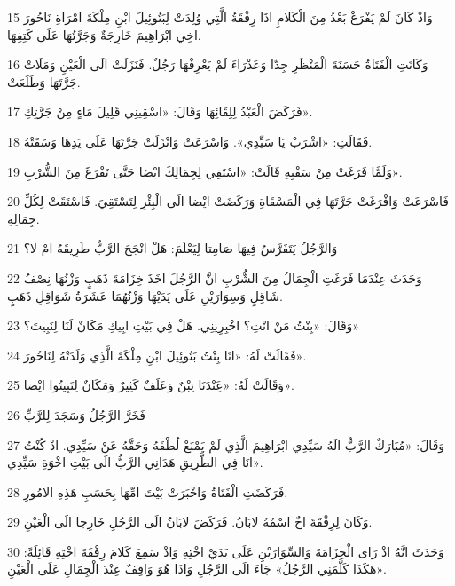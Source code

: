 \par 15 وَاذْ كَانَ لَمْ يَفْرَغْ بَعْدُ مِنَ الْكَلامِ اذَا رِفْقَةُ الَّتِي وُلِدَتْ لِبَتُوئِيلَ ابْنِ مِلْكَةَ امْرَاةِ نَاحُورَ اخِي ابْرَاهِيمَ خَارِجَةٌ وَجَرَّتُهَا عَلَى كَتِفِهَا.
\par 16 وَكَانَتِ الْفَتَاةُ حَسَنَةَ الْمَنْظَرِ جِدّا وَعَذْرَاءَ لَمْ يَعْرِفْهَا رَجُلٌ. فَنَزَلَتْ الَى الْعَيْنِ وَمَلَاتْ جَرَّتَهَا وَطَلَعَتْ.
\par 17 فَرَكَضَ الْعَبْدُ لِلِقَائِهَا وَقَالَ: «اسْقِينِي قَلِيلَ مَاءٍ مِنْ جَرَّتِكِ».
\par 18 فَقَالَتِ: «اشْرَبْ يَا سَيِّدِي». وَاسْرَعَتْ وَانْزَلَتْ جَرَّتَهَا عَلَى يَدِهَا وَسَقَتْهُ.
\par 19 وَلَمَّا فَرَغَتْ مِنْ سَقْيِهِ قَالَتْ: «اسْتَقِي لِجِمَالِكَ ايْضا حَتَّى تَفْرَغَ مِنَ الشُّرْبِ».
\par 20 فَاسْرَعَتْ وَافْرَغَتْ جَرَّتَهَا فِي الْمَسْقَاةِ وَرَكَضَتْ ايْضا الَى الْبِئْرِ لِتَسْتَقِيَ. فَاسْتَقَتْ لِكُلِّ جِمَالِهِ.
\par 21 وَالرَّجُلُ يَتَفَرَّسُ فِيهَا صَامِتا لِيَعْلَمَ: هَلْ انْجَحَ الرَّبُّ طَرِيقَهُ امْ لا؟
\par 22 وَحَدَثَ عِنْدَمَا فَرَغَتِ الْجِمَالُ مِنَ الشُّرْبِ انَّ الرَّجُلَ اخَذَ خِزَامَةَ ذَهَبٍ وَزْنُهَا نِصْفُ شَاقِلٍ وَسِوَارَيْنِ عَلَى يَدَيْهَا وَزْنُهُمَا عَشَرَةُ شَوَاقِلِ ذَهَبٍ.
\par 23 وَقَالَ: «بِنْتُ مَنْ انْتِ؟ اخْبِرِينِي. هَلْ فِي بَيْتِ ابِيكِ مَكَانٌ لَنَا لِنَبِيتَ؟»
\par 24 فَقَالَتْ لَهُ: «انَا بِنْتُ بَتُوئِيلَ ابْنِ مِلْكَةَ الَّذِي وَلَدَتْهُ لِنَاحُورَ».
\par 25 وَقَالَتْ لَهُ: «عَِنْدَنَا تِبْنٌ وَعَلَفٌ كَثِيرٌ وَمَكَانٌ لِتَبِيتُوا ايْضا».
\par 26 فَخَرَّ الرَّجُلُ وَسَجَدَ لِلرَّبِّ
\par 27 وَقَالَ: «مُبَارَكٌ الرَّبُّ الَهُ سَيِّدِي ابْرَاهِيمَ الَّذِي لَمْ يَمْنَعْ لُطْفَهُ وَحَقَّهُ عَنْ سَيِّدِي. اذْ كُنْتُ انَا فِي الطَّرِيقِ هَدَانِي الرَّبُّ الَى بَيْتِ اخْوَةِ سَيِّدِي».
\par 28 فَرَكَضَتِ الْفَتَاةُ وَاخْبَرَتْ بَيْتَ امِّهَا بِحَسَبِ هَذِهِ الامُورِ.
\par 29 وَكَانَ لِرِفْقَةَ اخٌ اسْمُهُ لابَانُ. فَرَكَضَ لابَانُ الَى الرَّجُلِ خَارِجا الَى الْعَيْنِ.
\par 30 وَحَدَثَ انَّهُ اذْ رَاى الْخِزَامَةَ وَالسِّوَارَيْنِ عَلَى يَدَيْ اخْتِهِ وَاذْ سَمِعَ كَلامَ رِفْقَةَ اخْتِهِ قَائِلَةً: «هَكَذَا كَلَّمَنِي الرَّجُلُ» جَاءَ الَى الرَّجُلِ وَاذَا هُوَ وَاقِفٌ عِنْدَ الْجِمَالِ عَلَى الْعَيْنِ.
